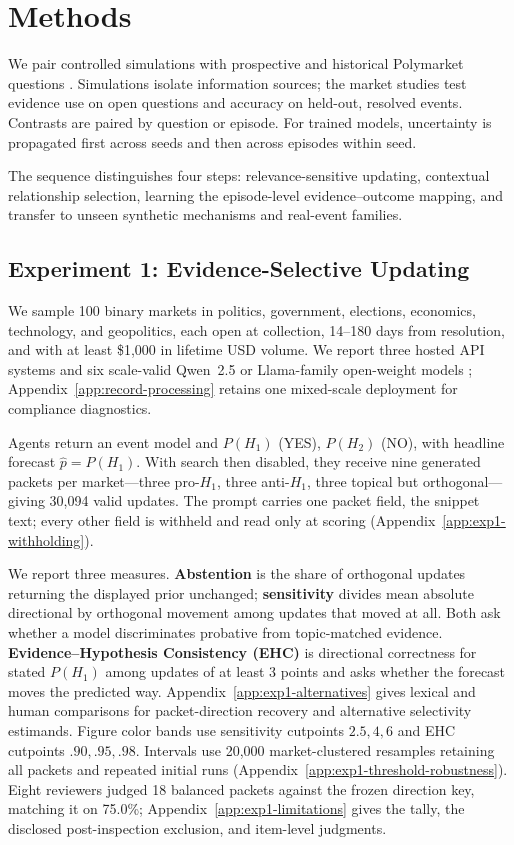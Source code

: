 \section{Methods}
\label{sec:methods}

We pair controlled simulations with prospective and historical Polymarket questions
\citep{gentzel2019case,polymarket2026docs}. Simulations isolate information sources;
the market studies test evidence use on open questions and accuracy on held-out,
resolved events. Contrasts are paired by question or episode. For trained models,
uncertainty is propagated first across seeds and then across episodes within seed.

The sequence distinguishes four steps: relevance-sensitive updating, contextual
relationship selection, learning the episode-level evidence--outcome mapping, and
transfer to unseen synthetic mechanisms and real-event families.


\subsection{Experiment 1: Evidence-Selective Updating}
\label{sec:methods-exp1}

We sample 100 binary markets in politics, government, elections, economics, technology, and
geopolitics, each open at collection, 14--180 days from resolution, and with at
least \$1,000 in lifetime USD volume. We report three
hosted API systems \citep{openai2026gpt54,anthropic2026claude48,deepseek2026v4}
and six scale-valid Qwen~2.5 or Llama-family open-weight models
\citep{qwen2025qwen25,grattafiori2024llama}; Appendix~\ref{app:record-processing}
retains one mixed-scale deployment for compliance diagnostics.

Agents return an event model and $P(H_1)$ (YES), $P(H_2)$ (NO), with headline
forecast $\hat p=P(H_1)$. With search then disabled, they receive nine generated
packets per market---three pro-$H_1$, three anti-$H_1$, three topical but
orthogonal---giving 30,094 valid updates. The prompt carries one packet field, the
snippet text; every other field is withheld and read only at scoring
(Appendix~\ref{app:exp1-withholding}).

We report three measures. \textbf{Abstention} is the share of orthogonal
updates returning the displayed prior unchanged; \textbf{sensitivity} divides mean
absolute directional by orthogonal movement among updates that moved at all. Both
ask whether a model discriminates probative from topic-matched evidence. \textbf{Evidence--Hypothesis Consistency
(EHC)} is directional correctness for stated $P(H_1)$ among updates of at least 3
points and asks whether the forecast moves the predicted way. Appendix~\ref{app:exp1-alternatives}
gives lexical and human comparisons for packet-direction recovery and alternative
selectivity estimands. Figure color bands use
sensitivity cutpoints $2.5,4,6$ and EHC cutpoints $.90,.95,.98$. Intervals use
20,000 market-clustered resamples retaining all packets and repeated initial runs
(Appendix~\ref{app:exp1-threshold-robustness}). Eight reviewers judged 18
balanced packets against the frozen direction key, matching it on 75.0\%;
Appendix~\ref{app:exp1-limitations} gives the tally, the disclosed
post-inspection exclusion, and item-level judgments.


